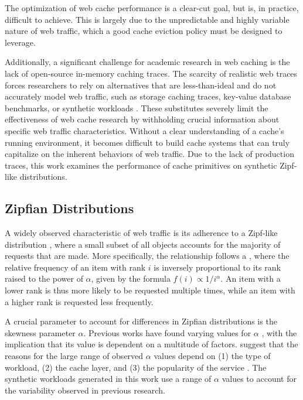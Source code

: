 The optimization of web cache performance is a clear-cut goal, but is, in practice, difficult to achieve. This is largely due to the unpredictable and highly variable nature of web traffic, which a good cache eviction policy must be designed to leverage.


Additionally, a significant challenge for academic research in web caching is the lack of open-source in-memory caching traces. The scarcity of realistic web traces forces researchers to rely on alternatives that are less-than-ideal and do not accurately model web traffic, such as storage caching traces, key-value database benchmarks, or synthetic workloads \cite{twitter-analysis}. These substitutes severely limit the effectiveness of web cache research by withholding crucial information about specific web traffic characteristics. Without a clear understanding of a cache's running environment, it becomes difficult to build cache systems that can truly capitalize on the inherent behaviors of web traffic. Due to the lack of production traces, this work examines the performance of cache primitives on synthetic Zipf-like distributions.

\subsection{Zipfian Distributions}\label{bkg: zipfian-distributions}

A widely observed characteristic of web traffic is its adherence to a Zipf-like distribution \cite{sieve, web-cache-overview, s3-fifo, internet-zipf, zipf-analysis}, where a small subset of all objects accounts for the majority of requests that are made. More specifically, the relationship follows a , where the relative frequency of an item with rank $i$ is inversely proportional to its rank raised to the power of $\alpha$, given by the formula \(f(i)\propto{1}/{i^\alpha}\). An item with a lower rank is thus more likely to be requested multiple times, while an item with a higher rank is requested less frequently. 


A crucial parameter to account for differences in Zipfian distributions is the skewness parameter $\alpha$. Previous works have found varying values for $\alpha$ \cite{twitter-analysis, youtube-traffic, sieve}, with the implication that its value is dependent on a multitude of factors. \citeauthor{sieve} suggest that the reasons for the large range of observed $\alpha$ values depend on (1) the type of workload, (2) the cache layer, and (3) the popularity of the service \cite{sieve}. The synthetic workloads generated in this work use a range of $\alpha$ values to account for the variability observed in previous research.

